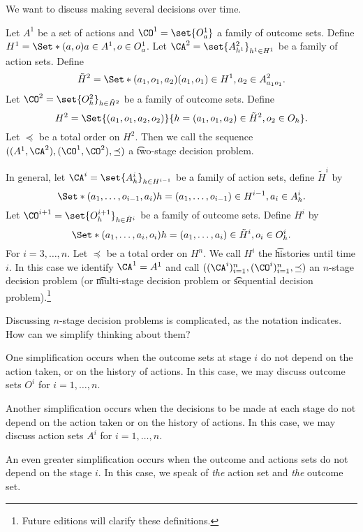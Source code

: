 

We want to discuss making several decisions over time.


Let $A^{1}$ be a set of actions and $\CO^1 = \set{O^{1}_a}$ a family of outcome sets.
Define $H^1 = \Set*{(a, o)}{a \in A^1, o \in O^{1}_a}$.
Let $\CA^2 = \set{A^{2}_{h^1}}_{h^1 \in H^1}$ be a family of action sets.
Define
\[
	\tilde{H}^{2} = \Set*{(a_1, o_1, a_2)}{(a_1, o_1) \in H^1, a_2 \in A^{2}_{a_1o_1}}.
\]
Let $\CO^2 = \set{O^{2}_{h}}_{h \in \tilde{H}^2}$ be a family of outcome sets.
Define
\[
	H^2 = \Set{(a_1, o_1, a_2, o_2)}{h = (a_1, o_1, a_2) \in \tilde{H}^2, o_2 \in O_{h}}.
\]
Let $\preceq$ be a total order on $H^2$.
Then we call the sequence $((A^1, \CA^2), (\CO^1, \CO^2), \preceq)$ a \t{two-stage decision problem}.


In general, let $\CA^{i} = \set{A^i_{h}}_{h \in H^{i-1}}$ be a family of action sets, define $\tilde{H}^i$ by
\[
 \Set*{(a_1, \dots, o_{i-1}, a_i)}{h = (a_1, \dots, o_{i-1}) \in H^{i-1}, a_i \in A^i_{h}}.
\]
Let $\CO^{i+1} = \set{O^{i+1}_{h}}_{h \in \tilde{H}^{i}}$ be a family of outcome sets. Define $H^{i}$ by
\[
 \Set*{(a_1, \dots, a_i, o_i)}{h = (a_1, \dots, a_i) \in \tilde{H}^{i}, o_i \in O^i_{h}}.
\]
For $i = 3, \dots, n$.
Let $\preceq$ be a total order on $H^{n}$.
We call $H^i$ the \t{histories until time $i$}.
In this case we identify $\CA^1 = A^1$ and call $((\CA^i)_{i = 1}^{n}, (\CO^i)_{i = 1}^{n}, \preceq)$ an \t{$n$-stage decision problem} (or \t{multi-stage decision problem} or \t{sequential decision problem}).\footnote{Future editions will clarify these definitions.}


Discussing $n$-stage decision problems is complicated, as the notation indicates.
How can we simplify thinking about them?

One simplification occurs when the outcome sets at stage $i$ do not depend on the action taken, or on the history of actions.
In this case, we may discuss outcome sets $O^i$ for $i = 1, \dots, n$.

Another simplification occurs when the decisions to be made at each stage do not depend on the action taken or on the history of actions.
In this case, we may discuss action sets $A^i$ for $i = 1, \dots, n$.

An even greater simplification occurs when the outcome and actions sets do not depend on the stage $i$.
In this case, we speak of \textit{the} action set and \textit{the} outcome set.

